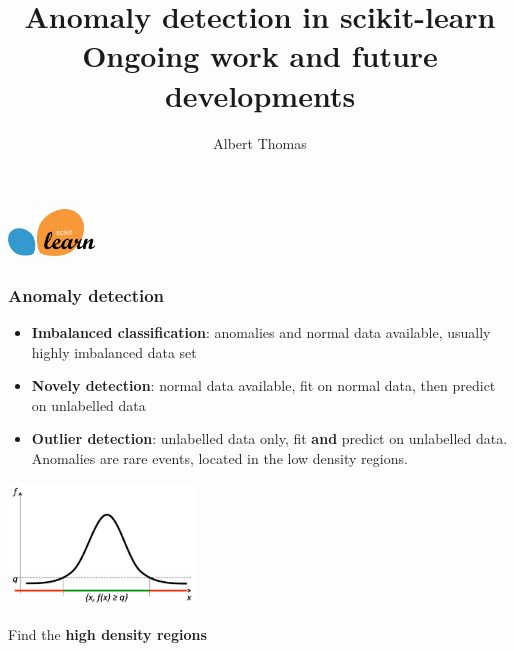 \documentclass[slidetop,11pt]{beamer}
\title{{\large Anomaly detection in scikit-learn} \\ {\normalfont \small{Ongoing work and future developments}}}
\author{Albert Thomas}
\institute{T\'el\'ecom ParisTech - Huawei Technologies}
\date{}
\begin{document}
\captionsetup[subfigure]{labelformat=empty}

\begin{frame}
\includegraphics[width=2.3cm]{img/scikit-learn-logo-notext.png}
\titlepage

\end{frame}


\begin{frame}
\frametitle{Anomaly detection}

\begin{itemize}
\item \textbf{Imbalanced classification}: anomalies and normal data available, usually highly imbalanced data set

\item \textbf{Novely detection}: normal data available, fit on normal data, then predict on unlabelled data

\item \textbf{Outlier detection}: unlabelled data only, fit \textbf{and} predict on unlabelled data. Anomalies are rare events, located in the low density regions.
\end{itemize}

\begin{center}
\includegraphics[width=5cm]{dls3.pdf}
\end{center}

\begin{center}
Find the \textbf{high density regions}
\end{center}

\end{frame}
\end{document}
